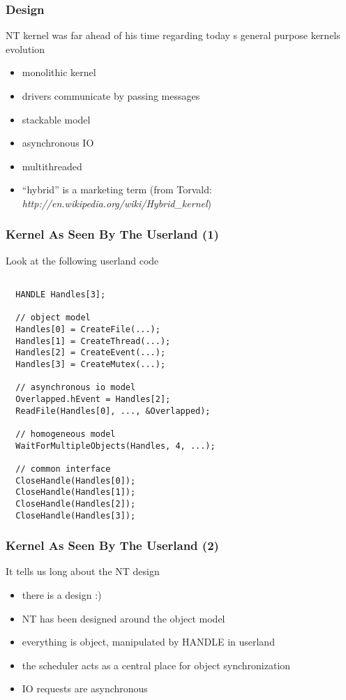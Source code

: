 \begin{frame}
  \frametitle{Design}

  NT kernel was far ahead of his time regarding today s general purpose kernels evolution

  \begin{itemize}
    \item
      monolithic kernel
    \item
      drivers communicate by passing messages
    \item
      stackable model
    \item
      asynchronous IO
    \item
      multithreaded
    \item
      ``hybrid'' is a marketing term (from Torvald: \textit{http://en.wikipedia.org/wiki/Hybrid\_kernel})
  \end{itemize}

\end{frame}


\begin{frame}[containsverbatim]
  \frametitle{Kernel As Seen By The Userland (1)}
   
  Look at the following userland code

  \begin{verbatim}

  HANDLE Handles[3];

  // object model
  Handles[0] = CreateFile(...);
  Handles[1] = CreateThread(...);
  Handles[2] = CreateEvent(...);
  Handles[3] = CreateMutex(...);

  // asynchronous io model
  Overlapped.hEvent = Handles[2];
  ReadFile(Handles[0], ..., &Overlapped);

  // homogeneous model
  WaitForMultipleObjects(Handles, 4, ...);

  // common interface
  CloseHandle(Handles[0]);
  CloseHandle(Handles[1]);
  CloseHandle(Handles[2]);
  CloseHandle(Handles[3]);

  \end{verbatim}
  
\end{frame}

\begin{frame}
  \frametitle{Kernel As Seen By The Userland (2)}

 It tells us long about the NT design

 \begin{itemize}
   \item
     there is a design :)
   \item
     NT has been designed around the object model
   \item
     everything is object, manipulated by HANDLE in userland
   \item
     the scheduler acts as a central place for object synchronization
   \item
     IO requests are asynchronous
 \end{itemize}

\end{frame}



